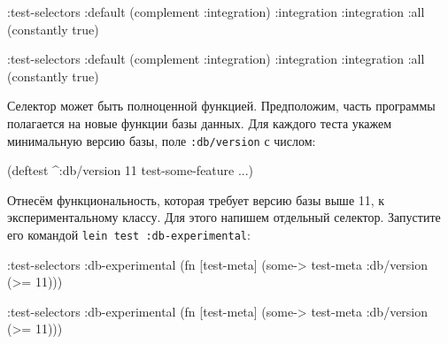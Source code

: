 \ifnarrow

\begin{english}
  \begin{clojure}
:test-selectors
  {:default (complement :integration)
   :integration :integration
   :all (constantly true)}
  \end{clojure}
\end{english}

\else

\begin{english}
  \begin{clojure}
:test-selectors {:default (complement :integration)
                 :integration :integration
                 :all (constantly true)}
  \end{clojure}
\end{english}

\fi

Селектор может быть полноценной функцией. Предположим, часть программы
полагается на новые функции базы данных. Для каждого теста укажем минимальную
версию базы, поле \verb|:db/version| с числом:

\begin{english}
  \begin{clojure}
(deftest ^{:db/version 11}
  test-some-feature
  ...)
  \end{clojure}
\end{english}

Отнесём функциональность, которая требует версию базы выше 11, к
экспериментальному классу. Для этого напишем отдельный селектор. Запустите его
командой \texttt{lein test :db-experi\-men\-tal}:

\ifnarrow

\begin{english}
  \begin{clojure}
:test-selectors
  {:db-experimental
   (fn [test-meta]
     (some-> test-meta
             :db/version
             (>= 11)))}
  \end{clojure}
\end{english}

\else

\begin{english}
  \begin{clojure}
:test-selectors
  {:db-experimental
    (fn [test-meta]
      (some-> test-meta :db/version (>= 11)))}
  \end{clojure}
\end{english}

\fi

